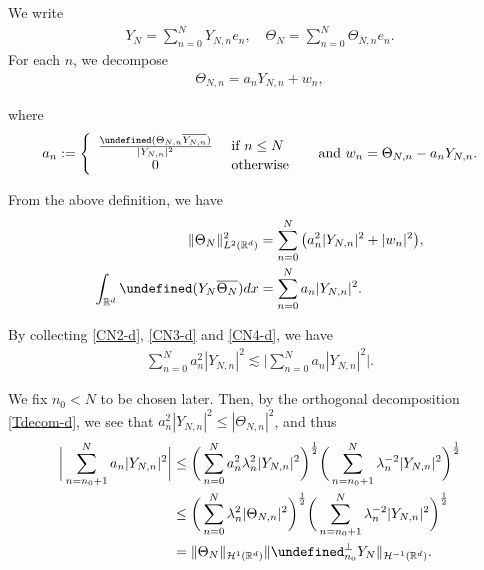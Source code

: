 \documentclass[%
11pt,  reqno]{amsart}
\theoremstyle{remarkstyle}
\newcommand{\1}{\hspace{0.2mm}\text{I}\hspace{0.2mm}}
\newcommand{\noi}{\noindent}
\newcommand{\R}{\mathbb{R}}
\let\Re=\undefined\DeclareMathOperator*{\Re}{Re}
\let\P= \undefined
\newcommand{\P}{\mathbf{P}}
\newcommand{\ld}{\lambda}
\newcommand{\les}{\lesssim}
\numberwithin{equation}{section}
\numberwithin{theorem}{section}
\begin{document}
	\noi We write
	\begin{align*}
		Y_N = \sum_{n=0}^N Y_{N,n} e_n, \quad \Theta_N = \sum_{n=0}^N \Theta_{N,n} e_n.
	\end{align*}
	For each $n$, we decompose 
	\begin{align}
		\label{Tdecom-d}
		\Theta_{N,n} = a_n Y_{N,n} + w_n ,
	\end{align}
	
	\noi 
	where 
	\begin{align*}
		a_n : = 
		\left\{
		\begin{array}{cl}
			\frac{\Re(\Theta_{N,n} \overline{Y_{N,n}})}{|Y_{N,n}|^2} & \textup{ if } n \le N\\
			0 & \textup{ otherwise}
		\end{array}
		\right.
		\quad \text{ and } w_n = \Theta_{N,n} - a_nY_{N,n}.
	\end{align*}
	
	\noi 
	From the above definition, we have
	\begin{align}
		\|\Theta_N\|_{L^2(\R^d)}^2 & = \sum_{n=0}^N \big(a_n^2 |Y_{N,n}|^2 + |w_n|^2\big) , \label{CN3-d}\\
		\int_{\R^d} \Re(Y_N \overline{\Theta_N}) dx & = \sum_{n=0}^N a_n |Y_{N,n}|^2.\label{CN4-d}
	\end{align}
	
	\noi 
	By collecting \eqref{CN2-d}, \eqref{CN3-d} and \eqref{CN4-d}, we have
	\begin{align}
		\label{CN5-d}
		\sum_{n=0}^N a_n^2 |Y_{N,n}|^2 \les \bigg| \sum_{n=0}^N a_n |Y_{N,n}|^2 \bigg| .
	\end{align}
	
	\noi 
	We fix $n_0 < N$ to be chosen later.
	Then, by the orthogonal decomposition \eqref{Tdecom-d}, we see that $a_n^2 |Y_{N,n}|^2 \le |\Theta_{N,n}|^2$, and thus
	\begin{align}
		\begin{split}
			\bigg| \sum_{n=n_0+1}^N a_n |Y_{N,n}|^2 \bigg| & \le \bigg( \sum_{n=0}^N a_n^2 \ld_n^2 |Y_{N,n}|^2\bigg)^{\frac12} \bigg( \sum_{n=n_0+1}^N \ld_n^{-2} |Y_{N,n}|^2\bigg)^{\frac12} \\
			& \le \bigg( \sum_{n=0}^N  \ld_n^2 |\Theta_{N,n}|^2\bigg)^{\frac12} \bigg( \sum_{n=n_0+1}^N \ld_n^{-2} |Y_{N,n}|^2\bigg)^{\frac12} \\
			& = \|\Theta_N \|_{\mathcal H^1(\R^d)} \| \P^{\perp}_{n_0} Y_N \|_{\mathcal H^{-1}(\R^d)}.
		\end{split}
		\label{CN6-d}
	\end{align}
	
\end{document}
